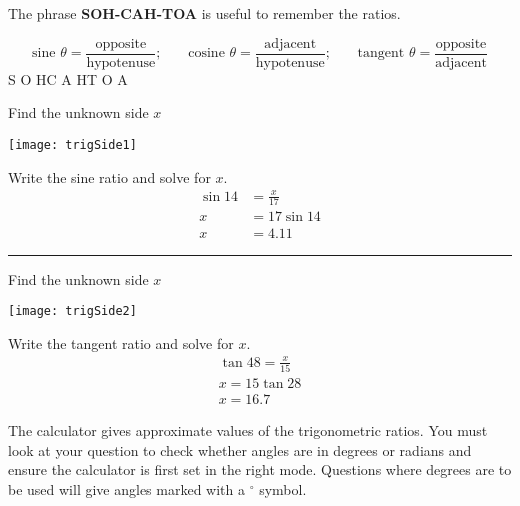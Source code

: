 The phrase \textbf{SOH-CAH-TOA} is useful to remember the ratios.
\begin{tcolorbox}
\begin{equation*}\text{sine }  \theta  =\frac{\text{opposite}}{\text{hypotenuse}}\text{;}\qquad\text{cosine }  \theta  =\frac{\text{adjacent}}{\text{hypotenuse}}\text{;}\qquad\text{tangent }  \theta  =\frac{\text{opposite}}{\text{adjacent}}
\end{equation*}\medskip
\hspace{2.5cm}S O H\hspace{3cm}C A H\hspace{4cm}T O A
\end{tcolorbox}

\begin{multicols}{2}
	\example Find the unknown side $x$\\
	\begin{center}
		\texttt{[image: trigSide1]}
	\end{center}

	\columnbreak
\solution Write the sine ratio and solve for $x$.\\
\begin{align*}\sin 14 &= \frac{x}{17}\\
x&=17\sin 14\\
x&=4.11\end{align*}
\end{multicols}
\rule{\textwidth}{0.5pt}
\begin{multicols}{2}
\example Find the unknown side $x$\\
\begin{center}
	\texttt{[image: trigSide2]}
\end{center}
	\columnbreak
\solution Write the tangent ratio and solve for $x$.
\begin{align*}\tan 48 = \frac{x}{15}\\
x=15\tan 28\\
x=16.7\end{align*}
\end{multicols}
The calculator gives approximate values of the trigonometric ratios. You must look at your question to check whether angles are in degrees or radians and ensure the calculator is first set in the right mode. Questions where degrees are to be used will give angles marked with a $^\circ$ symbol. 

